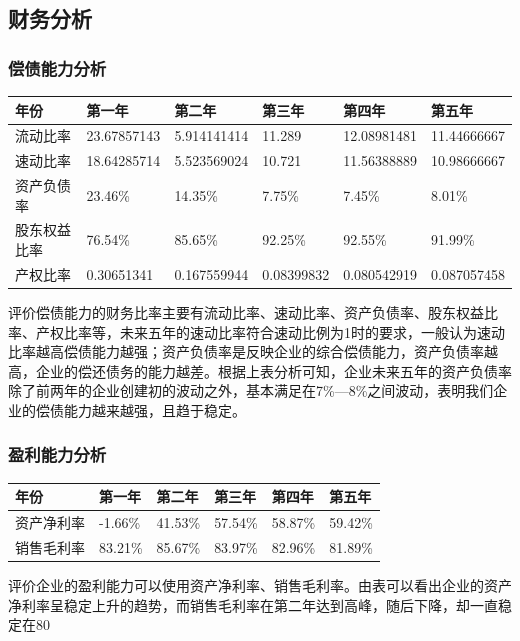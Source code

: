 \documentclass[master]{hduthesis}
\begin{document}
\subsection{财务分析}
\subsubsection{偿债能力分析}
\begin{table}[H]
	\centering
	\begin{tabular}{|l|l|l|l|l|l|}
		\hline
		\rowcolor[HTML]{FFFFFF}
		年份         & 第一年      & 第二年      & 第三年     & 第四年      & 第五年      \\ \hline
		流动比率     & 23.67857143 & 5.914141414 & 11.289     & 12.08981481 & 11.44666667 \\ \hline
		速动比率     & 18.64285714 & 5.523569024 & 10.721     & 11.56388889 & 10.98666667 \\ \hline
		资产负债率   & 23.46\%     & 14.35\%     & 7.75\%     & 7.45\%      & 8.01\%      \\ \hline
		股东权益比率 & 76.54\%     & 85.65\%     & 92.25\%    & 92.55\%     & 91.99\%     \\ \hline
		产权比率     & 0.30651341  & 0.167559944 & 0.08399832 & 0.080542919 & 0.087057458 \\ \hline
	\end{tabular}
\end{table}
评价偿债能力的财务比率主要有流动比率、速动比率、资产负债率、股东权益比率、产权比率等，未来五年的速动比率符合速动比例为1时的要求，一般认为速动比率越高偿债能力越强；资产负债率是反映企业的综合偿债能力，资产负债率越高，企业的偿还债务的能力越差。根据上表分析可知，企业未来五年的资产负债率除了前两年的企业创建初的波动之外，基本满足在7\%—8\%之间波动，表明我们企业的偿债能力越来越强，且趋于稳定。
\subsubsection{盈利能力分析}
\begin{table}[H]
	\centering
	\begin{tabular}{|l|l|l|l|l|l|}
		\hline
		年份       & 第一年  & 第二年  & 第三年  & 第四年  & 第五年  \\ \hline
		资产净利率 & -1.66\% & 41.53\% & 57.54\% & 58.87\% & 59.42\% \\ \hline
		销售毛利率 & 83.21\% & 85.67\% & 83.97\% & 82.96\% & 81.89\% \\ \hline
	\end{tabular}
\end{table}
评价企业的盈利能力可以使用资产净利率、销售毛利率。由表可以看出企业的资产净利率呈稳定上升的趋势，而销售毛利率在第二年达到高峰，随后下降，却一直稳定在80%
\end{document}
